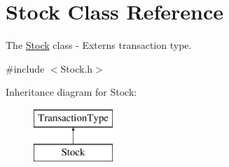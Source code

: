 \hypertarget{class_stock}{}\section{Stock Class Reference}
\label{class_stock}


The \mbox{\hyperlink{class_stock}{Stock}} class -\/ Externs transaction type.  




{\ttfamily \#include $<$Stock.\+h$>$}

Inheritance diagram for Stock\+:\begin{figure}[H]
\begin{center}
\leavevmode
\includegraphics[height=2.000000cm]{class_stock}
\end{center}
\end{figure}
